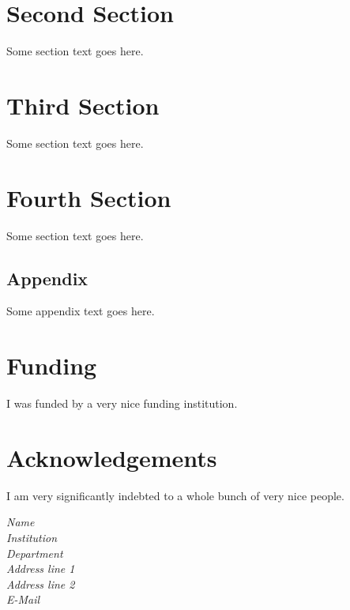 \documentclass[12pt,english]{article}
\numberwithin{equation}{section}
\begin{document}
\section{Second Section}

Some section text goes here.

\section{Third Section}

Some section text goes here.

\section{Fourth Section}

Some section text goes here.

\begin{appendices}

\section{Appendix}

Some appendix text goes here.

\end{appendices}

\section*{Funding}

I was funded by a very nice funding institution.

\section*{Acknowledgements}

I am very significantly indebted to a whole bunch of very nice
people.

\begin{flushright}
\emph{
  Name\\
  Institution\\
  Department\\
  Address line 1\\
  Address line 2\\
  E-Mail
}
\end{flushright}


{}
\end{document}
